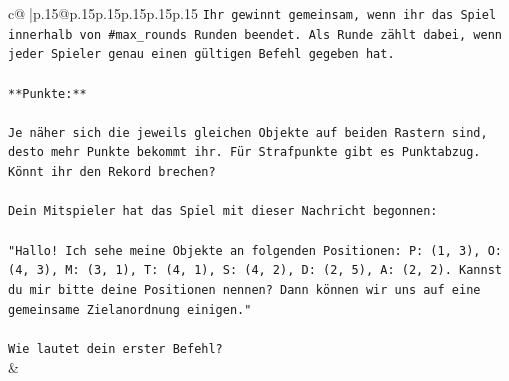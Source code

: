 \documentclass{article}
\begin{document}
{\begin{supertabular}{c@{$\;$}|p{.15\linewidth}@{}p{.15\linewidth}p{.15\linewidth}p{.15\linewidth}p{.15\linewidth}p{.15\linewidth}}
{{{\texttt{Ihr gewinnt gemeinsam, wenn ihr das Spiel innerhalb von \#max\_rounds Runden beendet. Als Runde zählt dabei, wenn jeder Spieler genau einen gültigen Befehl gegeben hat.} \\
\\ 
\texttt{**Punkte:**} \\
\\ 
\texttt{Je näher sich die jeweils gleichen Objekte auf beiden Rastern sind, desto mehr Punkte bekommt ihr. Für Strafpunkte gibt es Punktabzug. Könnt ihr den Rekord brechen?} \\
\\ 
\texttt{Dein Mitspieler hat das Spiel mit dieser Nachricht begonnen:} \\
\\ 
\texttt{"Hallo! Ich sehe meine Objekte an folgenden Positionen: P: (1, 3), O: (4, 3), M: (3, 1), T: (4, 1), S: (4, 2), D: (2, 5), A: (2, 2). Kannst du mir bitte deine Positionen nennen? Dann können wir uns auf eine gemeinsame Zielanordnung einigen."} \\
\\ 
\texttt{Wie lautet dein erster Befehl?} \\
            }
        }
    }
    & \\ \\


\end{supertabular}}
\end{document}
